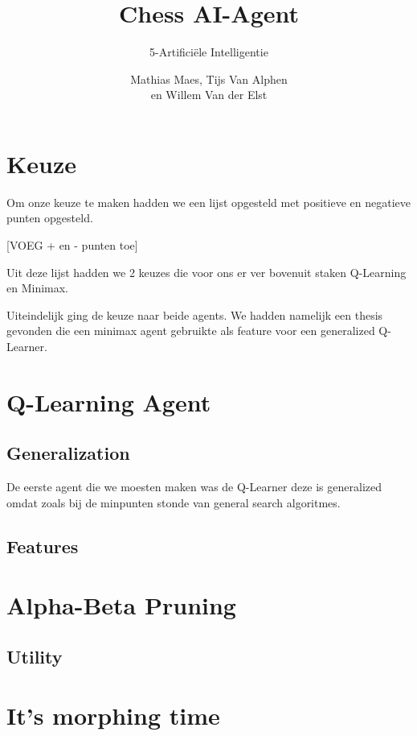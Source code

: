 \documentclass[a4paper,openany]{uantwerpenassignment}
\title{Chess AI-Agent}
\subtitle{5-Artificiële Intelligentie}
\author{Mathias Maes, Tijs Van Alphen \\en Willem Van der Elst}
\begin{document}
\maketitle

\tableofcontents

\chapter{Keuze}

Om onze keuze te maken hadden we een lijst opgesteld met positieve en negatieve punten opgesteld.

[VOEG + en - punten toe]

Uit deze lijst hadden we 2 keuzes die voor ons er ver bovenuit staken Q-Learning en Minimax.

Uiteindelijk ging de keuze naar beide agents. We hadden namelijk een thesis\cite{rl} gevonden die een minimax agent gebruikte als feature voor een generalized Q-Learner.

\chapter{Q-Learning Agent}

\section{Generalization}

De eerste agent die we moesten maken was de Q-Learner deze is generalized omdat zoals bij de minpunten stonde van general search algoritmes. 

\section{Features}

\chapter{Alpha-Beta Pruning}

\section{Utility}

\chapter{It's morphing time}

 

\end{document}
